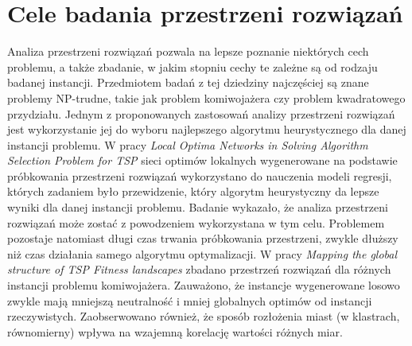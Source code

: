 \section{Cele badania przestrzeni rozwiązań}
Analiza przestrzeni rozwiązań pozwala na lepsze poznanie niektórych cech problemu, a także zbadanie, w jakim stopniu cechy te zależne są od
rodzaju badanej instancji. Przedmiotem badań z tej dziedziny najczęściej są znane problemy NP-trudne, takie jak problem komiwojażera czy problem kwadratowego przydziału.
Jednym z proponowanych zastosowań analizy przestrzeni rozwiązań jest wykorzystanie jej do wyboru najlepszego algorytmu heurystycznego
dla danej instancji problemu. W pracy \textit{Local Optima Networks in Solving Algorithm Selection Problem for TSP} \cite{DBLP:conf/depcos/BozejkoGNAB18}
sieci optimów lokalnych wygenerowane na podstawie próbkowania przestrzeni rozwiązań wykorzystano do nauczenia modeli regresji, których zadaniem było
przewidzenie, który algorytm heurystyczny da lepsze wyniki dla danej instancji problemu.
Badanie wykazało, że analiza przestrzeni rozwiązań może zostać z powodzeniem wykorzystana w tym celu.
Problemem pozostaje natomiast długi czas trwania próbkowania przestrzeni, zwykle dłuższy niż czas działania samego algorytmu optymalizacji.
W pracy \textit{Mapping the global structure of TSP Fitness landscapes} \cite{DBLP:journals/heuristics/OchoaV18} zbadano przestrzeń rozwiązań
dla różnych instancji problemu komiwojażera. Zauważono, że instancje wygenerowane losowo zwykle mają mniejszą neutralność i mniej globalnych optimów od
instancji rzeczywistych. Zaobserwowano również, że sposób rozłożenia miast (w klastrach, równomierny) wpływa na wzajemną korelację wartości różnych miar.

